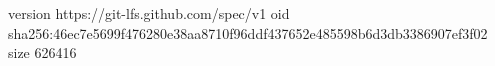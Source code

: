 version https://git-lfs.github.com/spec/v1
oid sha256:46ec7e5699f476280e38aa8710f96ddf437652e485598b6d3db3386907ef3f02
size 626416
